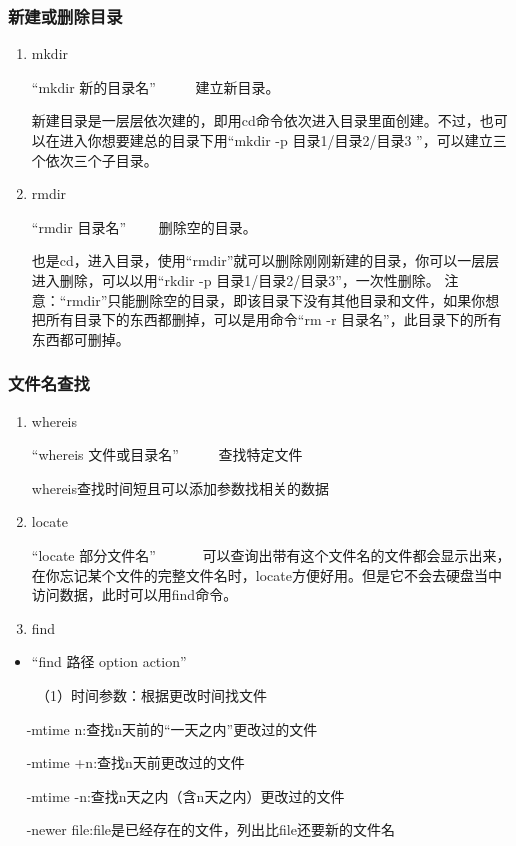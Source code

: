 \documentclass{article}
\begin{document}
\subsubsection{新建或删除目录}
\begin{enumerate}
\item mkdir

“mkdir 新的目录名”  ~~~~~建立新目录。

新建目录是一层层依次建的，即用cd命令依次进入目录里面创建。不过，也可以在进入你想要建总的目录下用“mkdir -p 目录1/目录2/目录3 ”，可以建立三个依次三个子目录。

\item rmdir

“rmdir 目录名”  ~~~~删除空的目录。

也是cd，进入目录，使用“rmdir”就可以删除刚刚新建的目录，你可以一层层进入删除，可以以用“rkdir -p 目录1/目录2/目录3”，一次性删除。
{\color{red}注意：}“{\color{red}rmdir}”只能删除{\color{red}空的目录}，即该目录下没有其他目录和文件，如果你想把所有目录下的东西都删掉，可以是用命令“rm -r 目录名”，此目录下的所有东西都可删掉。
\end{enumerate}
\subsubsection{文件名查找}
\begin{enumerate}
\item whereis

“whereis 文件或目录名”  ~~~~~查找特定文件

whereis查找时间短且可以添加参数找相关的数据

\item locate

“locate 部分文件名” ~~~~~~可以查询出带有这个文件名的文件都会显示出来，在你忘记某个文件的完整文件名时，locate方便好用。但是它不会去硬盘当中访问数据，此时可以用find命令。
\item find
\end{enumerate}
\begin{itemize}
\item  “find 路径 option action” 
\end {itemize}
 ~~~~（1）时间参数：根据更改时间找文件

~~ -mtime n:查找n天前的“一天之内”更改过的文件

~~ -mtime +n:查找n天前更改过的文件

~~ -mtime -n:查找n天之内（含n天之内）更改过的文件

~~ -newer file:file是已经存在的文件，列出比file还要新的文件名
\end{document}
